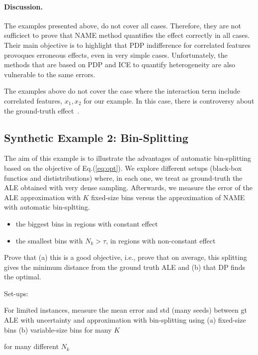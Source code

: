 \documentclass[twoside]{article}
\begin{document}
\paragraph{Discussion.}

The examples presented above, do not cover all cases. Therefore, they
are not sufficiect to prove that NAME method quantifies the effect
correctly in all cases. Their main objective is to highlight that PDP
indifference for correlated features provoques erroneous effects, even
in very simple cases. Unfortunately, the methods that are based on
PDP and ICE to quantify heterogeneity are also vulnerable to the same
errors.

The examples above do not cover the case where the interaction term
include correlated features, \(x_1, x_2\) for our example. In this
case, there is controversy about the ground-truth
effect~\citep{Gromping2020MAEP}.

\subsection{Synthetic Example 2: Bin-Splitting}

The aim of this example is to illustrate the advantages of automatic
bin-splitting based on the objective of Eq.(\ref{eq:opt}). We explore
different setups (black-box functios and dististributions) where, in
each one, we treat as ground-truth the ALE obtained with very dense
sampling. Afterwards, we measure the error of the ALE approximation
with \(K\) fixed-size bins versus the approximation of NAME with
automatic bin-spltting.

\begin{itemize}
\item the biggest bins in regions with constant effect
\item the smallest bins with \(N_k > \tau\), in regions with non-constant effect
\end{itemize}

Prove that (a) this is a good objective, i.e., prove that on average,
this splitting gives the minimum distance from the ground truth ALE
and (b) that DP finds the optimal.

Set-ups:

For limited instances, measure the mean error and std (many seeds)
between gt ALE with uncertainty and approximation with bin-splitting
using (a) fixed-size bins (b) variable-size bins for many \(K\)

for many different \(N_k\)
\end{document}
